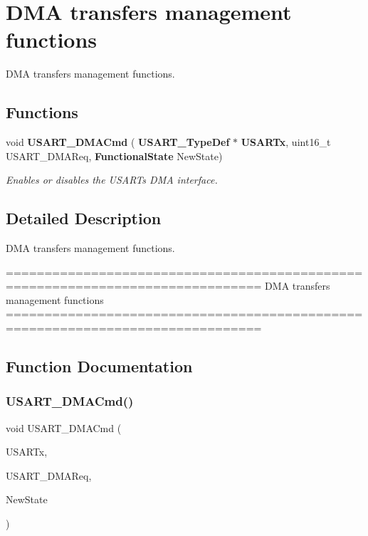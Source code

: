 \section{D\+MA transfers management functions}
\label{group__USART__Group8}


D\+MA transfers management functions.  


\subsection*{Functions}
\begin{DoxyCompactItemize}
\item 
void \textbf{ U\+S\+A\+R\+T\+\_\+\+D\+M\+A\+Cmd} (\textbf{ U\+S\+A\+R\+T\+\_\+\+Type\+Def} $\ast$\textbf{ U\+S\+A\+R\+Tx}, uint16\+\_\+t U\+S\+A\+R\+T\+\_\+\+D\+M\+A\+Req, \textbf{ Functional\+State} New\+State)
\begin{DoxyCompactList}\small\item\em Enables or disables the U\+S\+A\+RT\textquotesingle{}s D\+MA interface. \end{DoxyCompactList}\end{DoxyCompactItemize}


\subsection{Detailed Description}
D\+MA transfers management functions. 

\begin{DoxyVerb} ===============================================================================
                      DMA transfers management functions
 ===============================================================================  \end{DoxyVerb}
 

\subsection{Function Documentation}
\mbox{\label{group__USART__Group8_ga902857f199ebfba21c63d725354af66f}} 
\subsubsection{U\+S\+A\+R\+T\+\_\+\+D\+M\+A\+Cmd()}
{\footnotesize\ttfamily void U\+S\+A\+R\+T\+\_\+\+D\+M\+A\+Cmd (\begin{DoxyParamCaption}\item[{\textbf{ U\+S\+A\+R\+T\+\_\+\+Type\+Def} $\ast$}]{U\+S\+A\+R\+Tx,  }\item[{uint16\+\_\+t}]{U\+S\+A\+R\+T\+\_\+\+D\+M\+A\+Req,  }\item[{\textbf{ Functional\+State}}]{New\+State }\end{DoxyParamCaption})}



